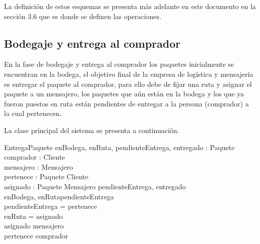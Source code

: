 \documentclass[12pt,a4paper,table]{article}
\begin{document}
La definición de estos esquemas se presenta más adelante en este documento en la sección 3.6 que es donde se definen las operaciones.

\subsection{Bodegaje y entrega al comprador}

En la fase de bodegaje y entrega al comprador los paquetes inicialmente se encuentran en la bodega, el objetivo final de la empresa de logística y mensajería es entregar el paquete al comprador, para ello debe de fijar una ruta y asignar el paquete a un mensajero, los paquetes que aún están en la bodega y los que ya fueron puestos en ruta están pendientes de entregar a la persona (comprador) a la cual pertenecen.

%
%



La clase principal del sistema se presenta a continuación.

\begin{schema}{EntregaPaquete}
enBodega, enRuta, pendienteEntrega, entregado : \power Paquete\\
comprador : \power Cliente\\ 
mensajero : \power Mensajero\\
pertenece : Paquete \pfun Cliente\\
asignado : Paquete \pfun Mensajero
\where
\disjoint \langle pendienteEntrega, entregado \rangle\\
\langle enBodega, enRuta\rangle \partition pendienteEntrega \\
pendienteEntrega = \dom pertenece \\
enRuta = \dom asignado \\
\ran asignado \subseteq mensajero \\
\ran pertenece \subseteq comprador
\end{schema}
\end{document}
